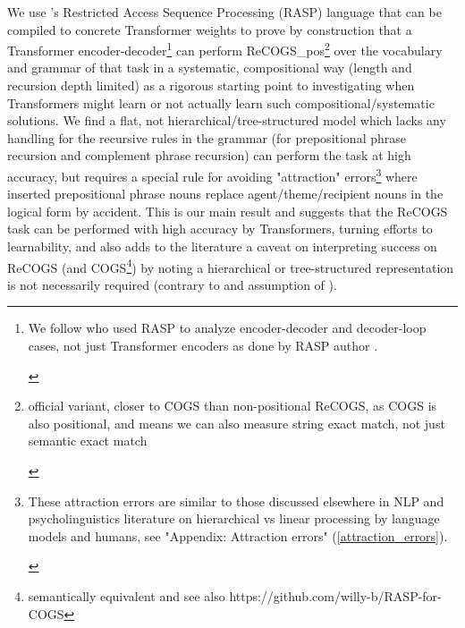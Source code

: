 \documentclass[11pt]{article}
\begin{document}
We use \cite{Weiss2021}'s Restricted Access Sequence Processing (RASP) language that can be compiled to concrete Transformer weights to prove by construction that a Transformer encoder-decoder\footnote{\begin{footnotesize}We follow \cite{Zhou2024} who used RASP to analyze encoder-decoder and decoder-loop cases, not just Transformer encoders as done by RASP author \cite{Weiss2021}.\end{footnotesize}} can perform ReCOGS\_pos\footnote{\begin{footnotesize}official variant, closer to COGS than non-positional ReCOGS, as COGS is also positional, and means we can also measure string exact match, not just semantic exact match\end{footnotesize}} over the vocabulary and grammar of that task in a systematic, compositional way (length and recursion depth limited) as a rigorous starting point to investigating when Transformers might learn or not actually learn such compositional/systematic solutions. We find a flat, not hierarchical/tree-structured model which lacks any handling for the recursive rules in the grammar (for prepositional phrase recursion and complement phrase recursion) can perform the task at high accuracy, but requires a special rule for avoiding "attraction" errors\footnote{\begin{footnotesize}These attraction errors are similar to those discussed elsewhere in NLP and psycholinguistics literature on hierarchical vs linear processing by language models and humans, see "Appendix: Attraction errors" (\ref{attraction_errors}).\end{footnotesize}} where inserted prepositional phrase nouns replace agent/theme/recipient nouns in the logical form by accident. This is our main result and suggests that the ReCOGS task can be performed with high accuracy by Transformers, turning efforts to learnability, and also adds to the literature a caveat on interpreting success on ReCOGS (and COGS\footnote{semantically equivalent and see also https://github.com/willy-b/RASP-for-COGS}) by noting a hierarchical or tree-structured representation is not necessarily required (contrary to \cite{KimLinzen2020} and assumption of \cite{murty2022characterizingintrinsiccompositionalitytransformers}).
\end{document}

